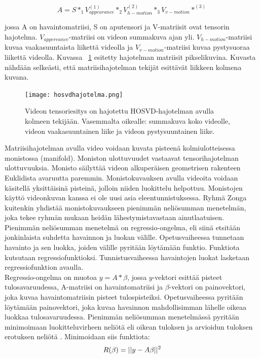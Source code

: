 \begin{equation}
A = S *_{1} V_{appearance}^{(1)} *_{2} V_{h-motion}^{(2)} *_{3} V_{v-motion}*^{(3)}
\end{equation}

jossa A on havaintomatriisi, S on aputensori ja V-matriisit ovat tensorin hajotelma. $V_{appereance}$-matriisi on
videon summakuva ajan yli. $V_{h-motion}$-matriisi kuvaa vaakasuuntaista liikettä videolla ja $V_{v-motion}$-matriisi
kuvaa pystysuoraa liikettä videolla. Kuvassa ~\ref{fig:hosvdhajotelma} esitetty hajotelman matriisit pikselikuvina.
Kuvasta nähdään selkeästi, että matriisihajotelman tekijät esittävät liikkeen kolmena kuvana. \citep {6239180}\\

\begin{figure}[htb]
  \begin{center}
    \texttt{[image: hosvdhajotelma.png]}
    \caption{Videon tensoriesitys on hajotettu HOSVD-hajotelman avulla kolmeen tekijään. Vasemmalta oikealle: summakuva koko videolle, videon vaakasuuntainen liike ja videon pystysuuntainen liike. \citep {6239180}}
    \label{fig:hosvdhajotelma}
  \end{center}
\end{figure}

Matriisihajotelman avulla video voidaan kuvata pisteenä kolmiulotteisessa monistossa (manifold). Moniston ulottuvuudet
vastaavat tensorihajotelman ulottuvuuksia. Monisto säilyttää videon 
alkuperäisen geometrisen rakenteen Euklidista avaruutta paremmin. \citep {Lui2012380} Monistokuvauksen avulla videoita voidaan käsitellä yksittäisinä
pisteinä, jolloin niiden luokittelu helpottuu. Monistojen käyttö videonkuvan kanssa ei ole uusi asia eleentunnistuksessa. 
Ryhmä Zonga kuitenkin yhdistää monistokuvaukseen pienimmän neliösumman menetelmän, joka tekee ryhmän mukaan heidän lähestymistavastaan
ainutlaatuisen.\citep {6239180}\\

Pienimmän neliösumman menetelmä on regressio-ongelma, eli siinä etsitään jonkinlaista suhdetta havainnon ja luokan välille. 
Opetusvaiheessa tunnetaan havainto ja sen luokka, joiden välille pyritään löytämään funktio. Funktiota kutsutaan regressiofunktioksi.
Tunnistusvaiheessa havaintojen luokat lasketaan regressiofunktion avaulla.\citep{leastsquares}\\

Regressio-ongelma on muotoa $y = A * \beta$, jossa $y$-vektori esittää pisteet tulosavaruudessa, A-matriisi on havaintomatriisi 
ja $\beta$-vektori on painovektori, joka kuvaa havaintomatriisin pisteet tulospisteiksi.
Opetusvaiheessa pyritään löytämään painovektori, joka kuvaa havainnon mahdollisimman lähelle oikeaa luokkaa
tulosavaruudessa. \citep {6239180} Pienimmän neliösumman menetelmässä pyritään minimoimaan luokitteluvirheen neliötä eli oikean tuloksen 
ja arvioidun tuloksen erotuksen neliötä \citep{leastsquares}.
Minimoidaan siis funktiota:
\begin{equation}
R(\beta) = ||y-A\beta||^2 \\
\end{equation}

